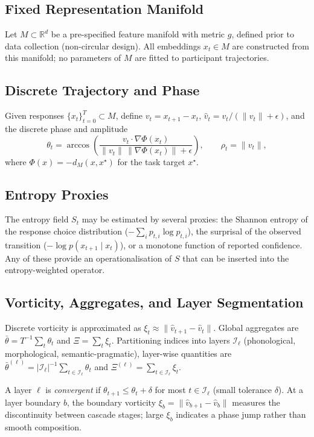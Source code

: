 \documentclass[12pt, a4paper]{article}
\theoremstyle{remark}
\theoremstyle{definition}
\begin{document}
\subsection{Fixed Representation Manifold}

Let $M \subset \mathbb{R}^d$ be a pre-specified feature manifold with metric $g$, defined
prior to data collection (non-circular design).  All embeddings $x_t \in M$ are
constructed from this manifold; no parameters of $M$ are fitted to participant trajectories.

\subsection{Discrete Trajectory and Phase}

Given responses $\{x_t\}_{t=0}^T \subset M$, define $v_t = x_{t+1} - x_t$,
$\hat{v}_t = v_t/(\|v_t\|+\epsilon)$, and the discrete phase and amplitude
\[
\theta_t = \arccos\!\left(
\frac{v_t \cdot \nabla\Phi(x_t)}{\|v_t\|\,\|\nabla\Phi(x_t)\|+\epsilon}
\right),
\qquad
\rho_t = \|v_t\|,
\]
where $\Phi(x) = -d_M(x, x^\star)$ for the task target $x^\star$.

\subsection{Entropy Proxies}

The entropy field $S_t$ may be estimated by several proxies: the Shannon entropy of the
response choice distribution ($-\sum_i p_{t,i}\log p_{t,i}$), the surprisal of the
observed transition ($-\log p(x_{t+1}\mid x_t)$), or a monotone function of reported
confidence.  Any of these provide an operationalisation of $S$ that can be inserted into
the entropy-weighted operator.

\subsection{Vorticity, Aggregates, and Layer Segmentation}

Discrete vorticity is approximated as $\xi_t \approx \|\hat{v}_{t+1} - \hat{v}_t\|$.
Global aggregates are $\bar\theta = T^{-1}\sum_t \theta_t$ and $\Xi = \sum_t \xi_t$.
Partitioning indices into layers $\mathcal{I}_\ell$ (phonological, morphological,
semantic-pragmatic), layer-wise quantities are $\bar\theta^{(\ell)} =
|\mathcal{I}_\ell|^{-1}\sum_{t\in\mathcal{I}_\ell}\theta_t$ and
$\Xi^{(\ell)} = \sum_{t\in\mathcal{I}_\ell}\xi_t$.

A layer $\ell$ is \emph{convergent} if $\theta_{t+1} \le \theta_t + \delta$ for most
$t \in \mathcal{I}_\ell$ (small tolerance $\delta$).  At a layer boundary $b$, the
boundary vorticity $\xi_b = \|\hat{v}_{b+1} - \hat{v}_b\|$ measures the discontinuity
between cascade stages; large $\xi_b$ indicates a phase jump rather than smooth
composition.
\end{document}
